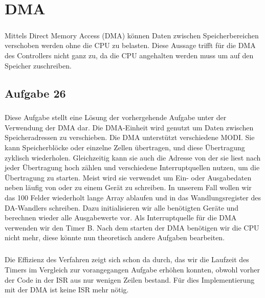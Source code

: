 \chapter{DMA}

\paragraph*{}
Mittels Direct Memory Access (DMA) können Daten zwischen Speicherbereichen verschoben werden ohne die CPU zu belasten. Diese Aussage trifft für die DMA des Controllers nicht ganz zu, da die CPU angehalten werden muss um auf den Speicher zuschreiben.

\section*{Aufgabe 26}

\paragraph*{}
Diese Aufgabe stellt eine Lösung der vorhergehende Aufgabe unter der Verwendung der DMA dar. Die DMA-Einheit wird genutzt um Daten zwischen Speicheradressen zu verschieben. Die DMA unterstützt verschiedene MODI. Sie kann Speicherblöcke oder einzelne Zellen übertragen, und diese Übertragung zyklisch wiederholen. Gleichzeitig kann sie auch die Adresse von der sie liest nach jeder Übertragung hoch zählen und verschiedene Interruptquellen nutzen, um die Übertragung zu starten. Meist wird sie verwendet um Ein- oder Ausgabedaten neben läufig von oder zu einem Gerät zu schreiben. In unserem Fall wollen wir das 100 Felder wiederholt lange Array ablaufen und in das Wandlungsregister des DA-Wandlers schreiben. Dazu initialisieren wir alle benötigten Geräte und berechnen wieder alle Ausgabewerte vor. Als Interruptquelle für die DMA verwenden wir den Timer B. Nach dem starten der DMA benötigen wir die CPU nicht mehr, diese könnte nun theoretisch andere Aufgaben bearbeiten.  




\paragraph*{}
Die Effizienz des Verfahren zeigt sich schon da durch, das wir die Laufzeit des Timers im Vergleich zur vorangegangen Aufgabe erhöhen konnten, obwohl vorher der Code in der ISR aus nur wenigen Zeilen bestand. Für dies Implementierung mit der DMA ist keine ISR mehr nötig.
